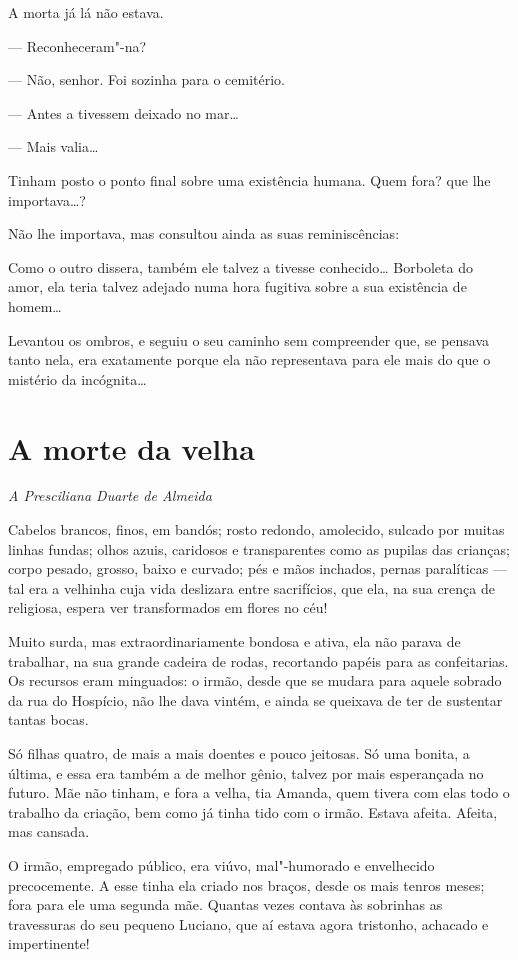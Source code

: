A morta já lá não estava.

--- Reconheceram"-na?

--- Não, senhor. Foi sozinha para o cemitério.

--- Antes a tivessem deixado no mar\ldots{}

--- Mais valia\ldots{}

Tinham posto o ponto final sobre uma existência humana. Quem fora? que
lhe importava\ldots{}?

Não lhe importava, mas consultou ainda as suas reminiscências:

Como o outro dissera, também ele talvez a tivesse conhecido\ldots{} Borboleta
do amor, ela teria talvez adejado numa hora fugitiva sobre a sua
existência de homem\ldots{}

Levantou os ombros, e seguiu o seu caminho sem compreender que, se
pensava tanto nela, era exatamente porque ela não representava para ele
mais do que o mistério da incógnita\ldots{}

\chapter{A morte da velha}

\hfill{}\emph{A Presciliana Duarte de Almeida}

\bigskip

\noindent{}Cabelos brancos, finos, em bandós; rosto redondo, amolecido, sulcado por
muitas linhas fundas; olhos azuis, caridosos e transparentes como as
pupilas das crianças; corpo pesado, grosso, baixo e curvado; pés e mãos
inchados, pernas paralíticas --- tal era a velhinha cuja vida deslizara
entre sacrifícios, que ela, na sua crença de religiosa, espera ver
transformados em flores no céu!

Muito surda, mas extraordinariamente bondosa e ativa, ela não parava de
trabalhar, na sua grande cadeira de rodas, recortando papéis para as
confeitarias. Os recursos eram minguados: o irmão, desde que se mudara
para aquele sobrado da rua do Hospício, não lhe dava vintém, e ainda se
queixava de ter de sustentar tantas bocas.

Só filhas quatro, de mais a mais doentes e pouco jeitosas. Só uma
bonita, a última, e essa era também a de melhor gênio, talvez por mais
esperançada no futuro. Mãe não tinham, e fora a velha, tia Amanda, quem
tivera com elas todo o trabalho da criação, bem como já tinha tido com o
irmão. Estava afeita. Afeita, mas cansada.

O irmão, empregado público, era viúvo, mal"-humorado e envelhecido
precocemente. A esse tinha ela criado nos braços, desde os mais tenros
meses; fora para ele uma segunda mãe. Quantas vezes contava às sobrinhas
as travessuras do seu pequeno Luciano, que aí estava agora tristonho,
achacado e impertinente!

